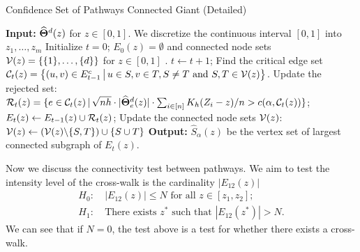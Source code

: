 \documentclass[11pt]{article}
\begin{document}
 \begin{algorithm}[t]
\caption{Confidence Set of Pathways Connected Giant (Detailed)}\label{al:conn}
\begin{algorithmic}
\STATE \textbf{Input:} $\widehat{\bm{\Theta}}^d(z)$ for $z\in [0,1]$. 
\STATE We discretize the continuous interval $[0,1]$ into $z_1, \ldots, z_m$
\STATE Initialize $t=0$; $E_0 (z) = \emptyset$ and connected node sets $\mathcal{V}(z) = \{\{1\}, \ldots, \{d\}\}$  for $z\in [0,1]$ .  
\REPEAT
\STATE $t \gets t+1$;
\STATE Find the critical edge set $\mathcal{C}_t(z) = \big\{ (u,v) \in E^c_{t-1} \, \big|\, u \in S, v \in T,  S \neq T \text{ and } S, T\in \mathcal{V}(z) \big\}$.
 \STATE Update the rejected set: $\mathcal{R}_t(z)=\{e\in \mathcal{C}_{t}(z)\,|\, \sqrt{nh} \cdot |\widehat{\bm{\Theta}}_e^d (z)| \cdot \sum_{i\in [n]} K_h(Z_i-z)/n  > c(\alpha, \mathcal{C}_{t}(z))\}$;
 \STATE $E_t(z) \gets E_{t-1}(z)  \cup \mathcal{R}_t(z)$;
  \STATE Update the connected node sets $\mathcal{V}(z)$:
  \STATE $\mathcal{V}(z) \gets (\mathcal{V}(z)\backslash\{S, T\}) \cup \{S\cup T\}$
  \ENDIF
  \ENDFOR
    \ENDFOR
  \STATE \textbf{Output:} $\hat S_{\alpha}(z)$ be the vertex set of largest connected subgraph of $E_t(z)$.
\end{algorithmic}
\end{algorithm}



  
Now we discuss the connectivity test between pathways. We aim to test the intensity level of the cross-walk is the cardinality $|E_{12}(z)|$
\begin{align*}
   H_0:~ &{|E_{12}(z)| \le N \text{ for all }  z \in [z_1, z_2]};\\
   H_1:~ &\text{There exists $z^*$ such that $|E_{12}(z^*)| > N$}.
\end{align*}
We can see that if $N = 0$, the test above is a test for whether there exists a cross-walk.
\end{document}
